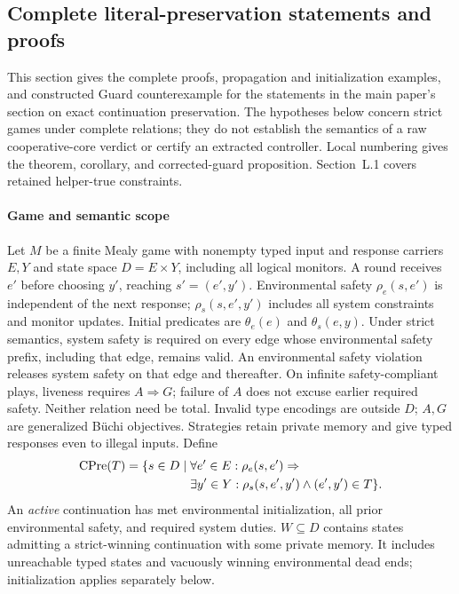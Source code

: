 \subsection{Complete literal-preservation statements and proofs}
\label{supp:literal-preservation}
This section gives the complete proofs, propagation and initialization
examples, and constructed Guard counterexample for the statements in
the main paper's section on exact continuation preservation. The hypotheses below concern strict games
under complete relations; they do not establish the semantics of a raw
cooperative-core verdict or certify an extracted controller. Local
numbering gives the theorem, corollary, and corrected-guard
proposition. Section~L.1 covers retained helper-true constraints.

\paragraph{Game and semantic scope}
Let $M$ be a finite Mealy game with nonempty typed input and response
carriers $E,Y$ and state space $D=E\times Y$, including all logical
monitors.
A round receives $e'$ before choosing $y'$, reaching $s'=(e',y')$.
Environmental safety $\rho_e(s,e')$ is independent of the next response;
$\rho_s(s,e',y')$ includes all system constraints and monitor updates.
Initial predicates are $\theta_e(e)$ and $\theta_s(e,y)$.
Under strict semantics, system safety is required on every edge whose
environmental safety prefix, including that edge, remains valid.
An environmental safety violation releases system safety on that edge
and thereafter. On infinite safety-compliant plays, liveness requires
$A\Rightarrow G$; failure of $A$ does not excuse earlier required safety.
Neither relation need be total. Invalid type encodings are outside $D$;
$A,G$ are generalized B\"uchi objectives. Strategies retain private
memory and give typed responses even to illegal inputs. Define
\[
\begin{aligned}
\operatorname{CPre}(T)=\{s\in D\mid{}&\forall e'\in E:\rho_e(s,e')\Rightarrow{}\\
 &\exists y'\in Y:\rho_s(s,e',y')\land (e',y')\in T\}.
\end{aligned}
\]
An \emph{active} continuation has met environmental initialization,
all prior environmental safety, and required system duties.
$W\subseteq D$ contains states admitting a strict-winning continuation
with some private memory. It includes unreachable typed states and
vacuously winning environmental dead ends; initialization applies
separately below.

